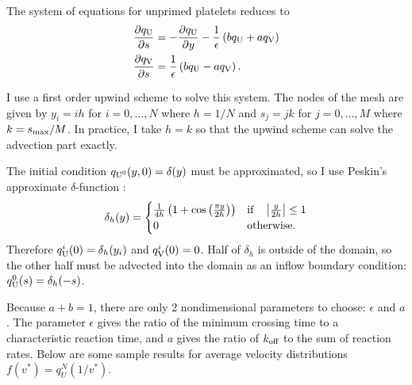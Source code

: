 \documentclass{article}
\newcommand{\tn}{\textnormal}
\newcommand{\dd}{d}
\newcommand{\Der}[2]{\frac{\dd #1}{\dd #2}}
\newcommand{\Pder}[2]{\frac{\partial #1}{\partial #2}}
\begin{document}
The system of equations for unprimed platelets reduces to
\begin{align}
  \label{eq:unprimed-1}
  \Pder{q_\tn{U}}{s} &= -\Pder{q_\tn{U}}{y} - \frac{1}{\epsilon}
                       \left(b q_\tn{U} + a q_\tn{V}\right) \\
  \label{eq:unprimed-2}
  \Pder{q_\tn{V}}{s} &= \frac{1}{\epsilon} \left(b q_\tn{U} - a
                       q_\tn{V}\right).
\end{align}

I use a first order upwind scheme to solve this system. The nodes of
the mesh are given by $y_i = ih$ for $i = 0, \hdots, N$ where
$h = 1/N$ and $s_j = jk$ for $j = 0, \hdots, M$ where $k =
s_\tn{max}/M$. In practice, I take $h = k$ so that the upwind scheme
can solve the advection part exactly.

The initial condition $q_{\tn{U}^0}(y, 0) = \delta(y)$ must be
approximated, so I use Peskin's approximate $\delta$-function
\cite{Peskin2002}:
\begin{equation}
  \label{eq:delta-h}
  \delta_h(y) =
  \begin{cases}
    \frac{1}{4h} \left( 1 + \cos\left(\frac{\pi y}{2h}\right) \right)
    & \tn{if} \quad \left|\frac{y}{2h}\right| \le 1 \\
    0 & \tn{otherwise.}
  \end{cases}
\end{equation}
Therefore $q_\tn{U}^i(0) = \delta_h(y_i)$ and $q_\tn{V}^i(0) =
0$. Half of $\delta_h$ is outside of the domain, so the other half
must be advected into the domain as an inflow boundary condition:
$q_\tn{U}^0(s) = \delta_h(-s)$.

Because $a + b = 1$, there are only 2 nondimensional parameters to
choose: $\epsilon$ and $a$. The parameter $\epsilon$ gives the ratio
of the minimum crossing time to a characteristic reaction time, and
$a$ gives the ratio of $k_\tn{off}$ to the sum of reaction
rates. Below are some sample results for average velocity
distributions $f(v^*) = q_U^N(1/v^*)$. 
\end{document}
